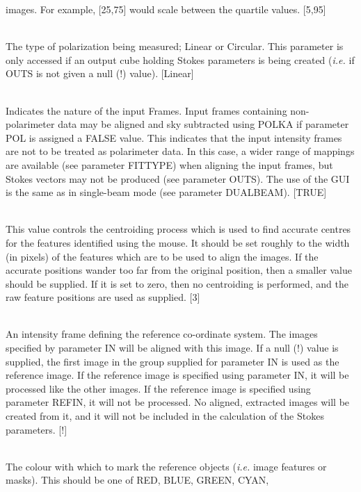 \documentclass[twoside,11pt]{article}
\renewcommand{\_}{\texttt{\symbol{95}}}
\newcommand{\sstsubsection}[1]{ \item[{#1}] \mbox{} \\}
\newcommand{\sstsubsection}[1]{\item[{#1}]}
\begin{document}
{{{         images. For example, [25,75] would scale between the quartile
         values. [5,95]
      }
      \sstsubsection{
         PMODE = LITERAL (Read)
      }{
         The type of polarization being measured; Linear or Circular. This
         parameter is only accessed if an output cube holding Stokes
         parameters is being created (\emph{i.e.} if OUT\_S is not given a null (!)
         value). [Linear]
      }
      \sstsubsection{
         POL = \_LOGICAL (Read)
      }{
         Indicates the nature of the input Frames. Input frames containing
         non-polarimeter data may be aligned and sky subtracted using POLKA
         if parameter POL is assigned a FALSE value. This indicates that the
         input intensity frames are not to be treated as polarimeter data. In
         this case, a wider range of mappings are available (see parameter
         FITTYPE) when aligning the input frames, but Stokes vectors may not
         be produced (see parameter OUT\_S). The use of the GUI is the same as
         in single-beam mode (see parameter DUALBEAM). [TRUE]
      }
      \sstsubsection{
         PSFSIZE = \_INTEGER (Update)
      }{
         This value controls the centroiding process which is used to find
         accurate centres for the features identified using the mouse.
         It should be set roughly to the width (in pixels) of the
         features which are to be used to align the images. If the
         accurate positions wander too far from the original position, then
         a smaller value should be supplied. If it is set to zero, then
         no centroiding is performed, and the raw feature positions are
         used as supplied. [3]
      }
      \sstsubsection{
         REFIN = NDF (Read)
      }{
         An intensity frame defining the reference co-ordinate system.
         The images specified by parameter IN will be aligned with this
         image. If a null (!) value is supplied, the first image in the
         group supplied for parameter IN is used as the reference image.
         If the reference image is specified using parameter IN, it will be
         processed like the other images. If the reference image is
         specified using parameter REFIN, it will not be processed. No
         aligned, extracted images will be created from it, and it will
         not be included in the calculation of the Stokes parameters. [!]
      }
      \sstsubsection{
         REFCOL = LITERAL (Update)
      }{
         The colour with which to mark the reference objects (\emph{i.e.} image
         features or masks). This should be one of RED, BLUE, GREEN, CYAN,
}}}
\end{document}
